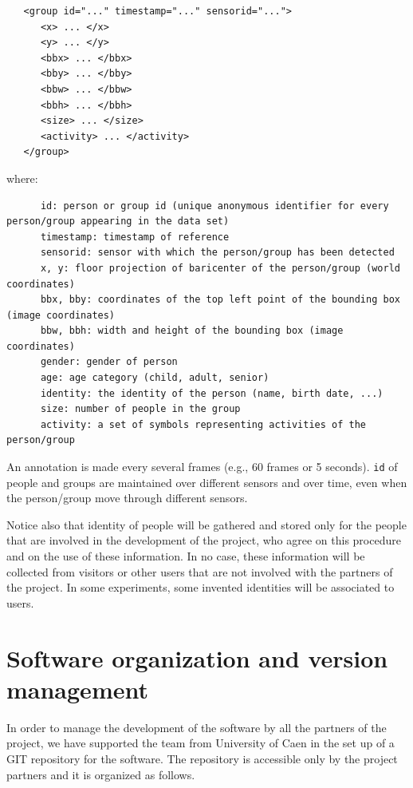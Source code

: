 \documentclass{article}
\begin{document}
\begin{verbatim}
   <group id="..." timestamp="..." sensorid="...">
      <x> ... </x>
      <y> ... </y>
      <bbx> ... </bbx>
      <bby> ... </bby>
      <bbw> ... </bbw>
      <bbh> ... </bbh>
      <size> ... </size>
      <activity> ... </activity>
   </group> 
\end{verbatim}

where:


\begin{verbatim}
      id: person or group id (unique anonymous identifier for every person/group appearing in the data set)
      timestamp: timestamp of reference
      sensorid: sensor with which the person/group has been detected
      x, y: floor projection of baricenter of the person/group (world coordinates)
      bbx, bby: coordinates of the top left point of the bounding box (image coordinates)
      bbw, bbh: width and height of the bounding box (image coordinates)
      gender: gender of person 
      age: age category (child, adult, senior)
      identity: the identity of the person (name, birth date, ...)
      size: number of people in the group
      activity: a set of symbols representing activities of the person/group
\end{verbatim}

An annotation is made every several frames (e.g., 60 frames or 5 seconds). {\tt id} of people and groups are maintained over different sensors and over time, even when the person/group move through different sensors.

Notice also that identity of people will be gathered and stored only for the people that are involved in the development of the project, who agree on this procedure and on the use of these information. In no case, these information will be collected from visitors or other users that are not involved with the partners of the project.
In some experiments, some invented identities will be associated to users. 

\section{Software organization and version management}

In order to manage the development of the software by all the partners of the project, we have supported the team from University of Caen in the set up of a GIT repository for the software.
The repository is accessible only by the project partners and it is organized as follows.
\end{document}
